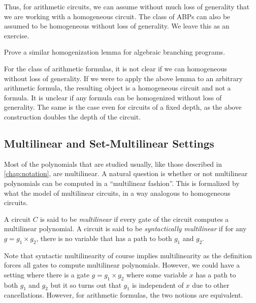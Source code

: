 Thus, for arithmetic circuits, we can assume without much loss of generality that we are working with a homogeneous circuit. 
The class of ABPs can also be assumed to be homogeneous without loss of generality. 
We leave this as an exercise.

\begin{exercise}
    Prove a similar homogenization lemma for algebraic branching programs. 
\end{exercise}

\begin{remark*}
    For the class of arithmetic formulas, it is not clear if we can homogeneous without loss of generality. 
    If we were to apply the above lemma to an arbitrary arithmetic formula, the resulting object is a homogeneous circuit and not a formula. 
    It is unclear if any formula can be homogenized without loss of generality. 
    The same is the case even for circuits of a fixed depth, as the above construction doubles the depth of the circuit.  
\end{remark*}


\subsection{Multilinear and Set-Multilinear Settings}

Most of the polynomials that are studied usually, like those described in \autoref{chap:notation}, are multilinear. 
A natural question is whether or not multilinear polynomials can be computed in a ``multilinear fashion''. 
This is formalized by what the model of multilinear circuits, in a way analogous to homogeneous circuits. 

\begin{definition}
A circuit $C$ is said to be \emph{multilinear} if every gate of the circuit computes a multilinear polynomial. 
A circuit is said to be \emph{syntactically multilinear} if for any $g = g_1 \times g_2$, there is no variable that has a path to both $g_1$ and $g_2$. 
\end{definition}

Note that syntactic multilinearity of course implies multilinearity as the definition forces all gates to compute multilinear polynomials. 
However, we could have a setting where there is a gate $g = g_1 \times g_2$ where some variable $x$ has a path to both $g_1$ and $g_2$ but it so turns out that $g_1$ is independent of $x$ due to other cancellations. 
However, for arithmetic formulas, the two notions are equivalent. 

